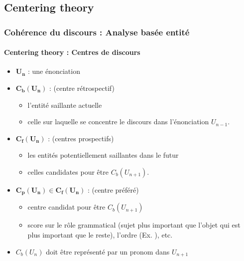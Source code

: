\documentclass[xcolor=table]{beamer}
\begin{document}
\subsection{Centering theory}

\begin{frame}
	\frametitle{Cohérence du discours : Analyse basée entité}
	\framesubtitle{Centering theory : Centres de discours}
	
	\begin{itemize}
		\item $\mathbf{U_n}$ : une énonciation
		\item $\mathbf{C_b(U_n)}$ :  (centre rétrospectif)
		\begin{itemize}
			\item l'entité saillante actuelle
			\item celle sur laquelle se concentre le discours dans l'énonciation $ U_{n-1} $.
		\end{itemize}
		\item $\mathbf{C_f(U_n)}$ :  (centres prospectifs)
		\begin{itemize}
			\item les entités potentiellement saillantes dans le futur
			\item celles candidates pour être $C_b(U_{n+1})$.
		\end{itemize}
		\item $\mathbf{C_p(U_n) \in C_f(U_n)}$ :  (centre préféré)
		\begin{itemize}
			\item centre candidat pour être $C_b(U_{n+1})$
			\item score sur le rôle grammatical (sujet plus important que l'objet qui est plus important que le reste), l'ordre (Ex. ), etc.
		\end{itemize}
		\item $C_b(U_n)$ doit être représenté par un pronom dans $U_{n+1}$
	\end{itemize}
	
\end{frame}
\end{document}
